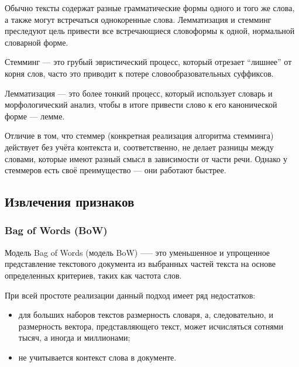 Обычно тексты содержат разные грамматические формы одного и того же слова, а также могут встречаться однокоренные слова. Лемматизация и стемминг преследуют цель привести все встречающиеся словоформы к одной, нормальной словарной форме. 

Стемминг –-- это грубый эвристический процесс, который отрезает ``лишнее'' от корня слов, часто это приводит к потере словообразовательных суффиксов. 

Лемматизация –-- это более тонкий процесс, который использует словарь и морфологический анализ, чтобы в итоге привести слово к его канонической форме –-- лемме. 

Отличие в том, что стеммер (конкретная реализация алгоритма стемминга) действует без учёта контекста и, соответственно, не делает разницы между словами, которые имеют разный смысл в зависимости от части речи. Однако у стеммеров есть своё преимущество –-- они работают быстрее.

\subsection{Извлечения признаков}
\subsubsection{Bag of Words (BoW)}
Модель Bag of Words (модель BoW) —-- это уменьшенное и упрощенное представление текстового документа из выбранных частей текста на основе определенных критериев, таких как частота слов.

При всей простоте реализации данный подход имеет ряд недостатков:
\begin{itemize}[label = ---]
    \item для больших наборов текстов размерность словаря, а, следовательно, и размерность вектора, представляющего текст, может исчисляться сотнями тысяч, а иногда и миллионами;
    \item не учитывается контекст слова в документе.
\end{itemize}


